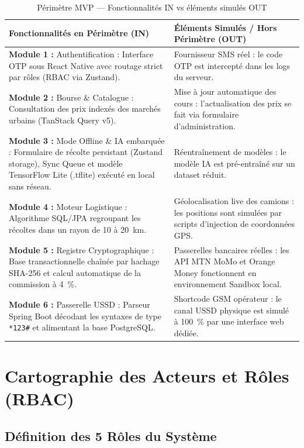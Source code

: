 \documentclass[12pt,a4paper]{report}
\begin{document}
\begin{table}[H]
\centering
\caption{Périmètre MVP — Fonctionnalités IN vs éléments simulés OUT}
\begin{tabularx}{\textwidth}{X X}
\toprule
\textbf{Fonctionnalités en Périmètre (IN)} & \textbf{Éléments Simulés / Hors Périmètre (OUT)} \\
\midrule
\textbf{Module 1 :} Authentification : Interface OTP sous React Native avec routage strict par rôles (RBAC via Zustand). & Fournisseur SMS réel : le code OTP est intercepté dans les logs du serveur. \\
\textbf{Module 2 :} Bourse \& Catalogue : Consultation des prix indexés des marchés urbains (TanStack Query v5). & Mise à jour automatique des cours : l'actualisation des prix se fait via formulaire d'administration. \\
\textbf{Module 3 :} Mode Offline \& IA embarquée : Formulaire de récolte persistant (Zustand storage), Sync Queue et modèle TensorFlow Lite (.tflite) exécuté en local sans réseau. & Réentraînement de modèles : le modèle IA est pré-entraîné sur un dataset réduit. \\
\textbf{Module 4 :} Moteur Logistique : Algorithme SQL/JPA regroupant les récoltes dans un rayon de 10 à 20~km. & Géolocalisation live des camions : les positions sont simulées par scripts d'injection de coordonnées GPS. \\
\textbf{Module 5 :} Registre Cryptographique : Base transactionnelle chaînée par hachage SHA-256 et calcul automatique de la commission à 4~\%. & Passerelles bancaires réelles : les API MTN MoMo et Orange Money fonctionnent en environnement Sandbox local. \\
\textbf{Module 6 :} Passerelle USSD : Parseur Spring Boot décodant les syntaxes de type \texttt{*123\#} et alimentant la base PostgreSQL. & Shortcode GSM opérateur : le canal USSD physique est simulé à 100~\% par une interface web dédiée. \\
\bottomrule
\end{tabularx}
\end{table}

\section{Cartographie des Acteurs et Rôles (RBAC)}

\subsection{Définition des 5 Rôles du Système}
\end{document}
